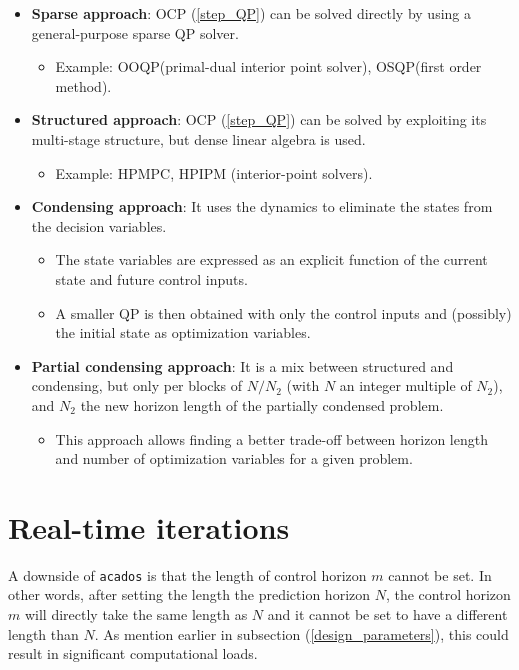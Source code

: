 \documentclass{thesisreport}
\begin{document}
	\begin{itemize}
        \item \textbf{Sparse approach}: OCP (\ref{step_QP}) can be solved directly by using a general-purpose sparse QP solver. 
        \begin{itemize}
            \item Example: OOQP(primal-dual interior point solver), OSQP(first order method).
        \end{itemize}
        \item \textbf{Structured approach}: OCP (\ref{step_QP}) can be solved by exploiting its multi-stage structure, but dense linear algebra is used. 
        \begin{itemize}
            \item Example: HPMPC, HPIPM (interior-point solvers).
        \end{itemize}
        \item \textbf{Condensing approach}: It uses the dynamics to eliminate the states from the decision variables.
        \begin{itemize}
            \item The state variables are expressed as an explicit function of the current state and future control inputs.
            \item A smaller QP is then obtained with only the control inputs and (possibly) the initial state as optimization variables.
        \end{itemize}
        \item \textbf{Partial condensing approach}: It is a mix between structured and condensing, but only per blocks of $N/N_2$ (with $N$ an integer multiple of $N_2$), and $N_2$ the new horizon length of the partially condensed problem.
        \begin{itemize}
            \item This approach allows finding a better trade-off between horizon length and number of optimization variables for a given problem.
        \end{itemize}
    \end{itemize}

\section{Real-time iterations}

A downside of \texttt{acados} is that the length of control horizon $m$ cannot be set. In other words, after setting the length the prediction horizon $N$, the control horizon $m$ will directly take the same length as $N$ and it cannot be set to have a different length than $N$. As mention earlier in subsection (\ref{design_parameters}), this could result in significant computational loads.
\end{document}

